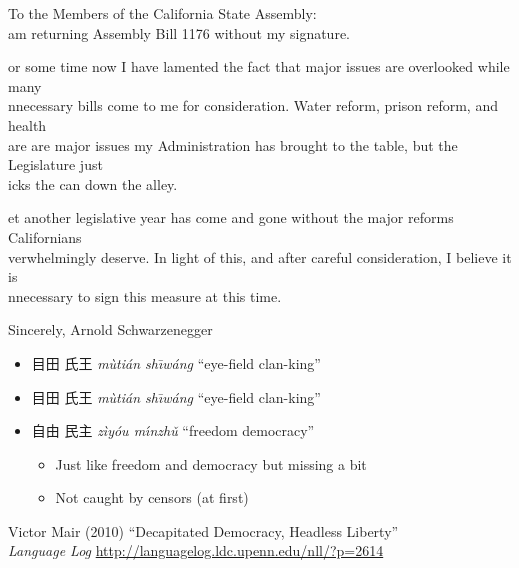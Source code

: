 \documentclass[a4paper,landscape,headrule,footrule,xetex]{foils}
\begin{document}
\begin{flushleft}\small
  To the Members of the California State Assembly:\\
  am returning   Assembly Bill 1176 without my signature. 

or some time now I have lamented the fact that major issues are overlooked while many \\
nnecessary bills come to me for consideration. Water reform, prison reform, and health \\
are are  major issues my Administration has brought to the table, but the Legislature just \\
icks the can down the alley.

et another legislative year has come and gone without the major reforms Californians \\
verwhelmingly deserve. In light of this, and after careful consideration, I believe it is \\
nnecessary to sign this measure at this time.

  Sincerely, Arnold Schwarzenegger
\end{flushleft}



\begin{itemize}
\item {\Large 目田 氏王} \textit{mùtián sh\={\i}wáng} ``eye-field clan-king''
\end{itemize}


\begin{itemize}
\item {\Large 目田 氏王} \textit{mùtián sh\={\i}wáng} ``eye-field clan-king''
\item {\Large 自由 民主} \textit{zìyóu m\'{\i}nzh\v{u}} ``freedom democracy'' 
  \begin{itemize}
  \item Just like freedom and democracy but missing a bit
  \item Not caught by censors (at first)
  \end{itemize}
\end{itemize}

{\small 
Victor Mair (2010) ``Decapitated Democracy, Headless Liberty''\\ \textit{Language Log} 
\url{http://languagelog.ldc.upenn.edu/nll/?p=2614}}
\end{document}
